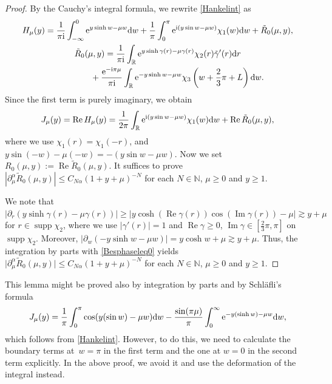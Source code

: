 \documentclass[10pt,a4paper]{amsart}
\numberwithin{equation}{section}
\def\R{\mathbb{R}}%
\DeclareMathOperator{\supp}{supp}%
\DeclareMathOperator{\re}{Re}%
\DeclareMathOperator{\im}{Im}%
\def\a{\alpha}
\def\c{\gamma}
\def\m{\mu}
\def\pa{\partial}
\begin{document}
\begin{proof}
By the Cauchy's integral formula, we rewrite \eqref{Hankelint} as
\begin{gather*}
H_{\m}(y)=\frac{1}{\pi {\rm i}}\int_{-\infty}^0{\rm e}^{y\sinh w-\m w}{\rm d}w+\frac{1}{\pi}\int_0^{\pi}{\rm e}^{{\rm i}(y\sin w-\m w)}\chi_1(w){\rm d}w+\tilde{R}_0(\m,y),\\
\tilde{R}_0(\m,y)=\frac{1}{\pi {\rm i}}\int_{\R}{\rm e}^{y\sinh \c(r)-\m \c(r)}\chi_2(r)\tilde{\c}'(r){\rm d}r\\
\phantom{\tilde{R}_0(\m,y)=}{}+\frac{{\rm e}^{-{\rm i}\pi\m}}{\pi {\rm i}}\int_{\R}{\rm e}^{-y\sinh w-\m w}\chi_3\left(w+\frac{2}{3}\pi+L\right){\rm d}w.
\end{gather*}
Since the first term is purely imaginary, we obtain
\begin{align*}
J_{\m}(y)=\re H_{\m}(y)=\frac{1}{2\pi}\int_{\R}{\rm e}^{{\rm i}(y\sin w-\m w)}\chi_1(w){\rm d}w+\re \tilde{R}_0(\m,y),
\end{align*}
where we use $\chi_1(r)=\chi_1(-r)$, \smash{$\supp \chi_1\subset \bigl(-\frac{3}{4}\pi,\frac{3}{4}\pi\bigr)$} and $y\sin(- w)-\m(-w)=-(y\sin w-\m w)$. Now we set $R_0(\m,y):=\re \tilde{R}_0(\m,y)$.
It suffices to prove $|\pa_{\m}^{\a}\tilde{R}_0(\m,y)|\leq C_{N\a}(1+y+\m)^{-N}$ for each $N\in\mathbb{N}$, $\m\geq 0$ and $y\geq 1$.

We note that $|\pa_r(y\sinh\c(r)-\m\c(r))|\geq |y\cosh (\re \c(r))\cos(\im \c(r))-\m|\gtrsim y+\m$ for $r\in \supp \chi_2$, where we use $|\c'(r)|=1$ and $\re\c\geq 0$, $\im \c\in [\frac{2}{3}\pi,\pi]$ on $\supp \chi_2$. Moreover, $|\pa_w(-y\sinh w-\m w)|=y\cosh w+\m \gtrsim y+\m$. Thus, the integration by parts with \eqref{Besphaseleq0} yields~${\big|\pa_{\m}^{\a}\tilde{R}_0(\m,y)\big|\leq C_{N\a}(1+y+\m)^{-N}}$ for each $N\in\mathbb{N}$, $\m\geq 0$ and $y\geq 1$.
\end{proof}

\begin{Remark}
This lemma might be proved also by integration by parts and by Schl\"afli's formula
\begin{align*}
J_{\m}(y)=\frac{1}{\pi}\int_0^{\pi}\cos (y(\sin w)-\m w){\rm d}w-\frac{\sin (\pi\m)}{\pi}\int_0^{\infty}{\rm e}^{-y(\sinh w)-\m w}{\rm d}w,
\end{align*}
which follows from \eqref{Hankelint}.
However, to do this, we need to calculate the boundary terms at~${w=\pi}$ in the first term and the one at $w=0$ in the second term explicitly. In the above proof, we avoid it and use the deformation of the integral instead.
\end{Remark}
\end{document}

